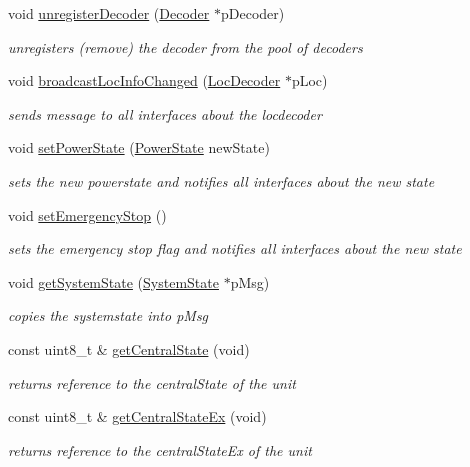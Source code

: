 \begin{DoxyCompactItemize}
void \hyperlink{classTBT_1_1Manager_a507ac74f4adfbb6173728bebe71e40e6_a507ac74f4adfbb6173728bebe71e40e6}{unregister\+Decoder} (\hyperlink{classTBT_1_1Decoder}{Decoder} $\ast$p\+Decoder)
\begin{DoxyCompactList}\small\item\em unregisters (remove) the decoder from the pool of decoders \end{DoxyCompactList}\item 
void \hyperlink{classTBT_1_1Manager_aaac6dc1a57d9c578a3da2243584a8a22_aaac6dc1a57d9c578a3da2243584a8a22}{broadcast\+Loc\+Info\+Changed} (\hyperlink{classTBT_1_1LocDecoder}{Loc\+Decoder} $\ast$p\+Loc)
\begin{DoxyCompactList}\small\item\em sends message to all interfaces about the locdecoder \end{DoxyCompactList}\item 
void \hyperlink{classTBT_1_1Manager_a6e7616a839a1b48d89355bc740ed7793_a6e7616a839a1b48d89355bc740ed7793}{set\+Power\+State} (\hyperlink{namespaceTBT_a05cc33b74a68fb6eaf5962b5979716d4_a05cc33b74a68fb6eaf5962b5979716d4}{Power\+State} new\+State)
\begin{DoxyCompactList}\small\item\em sets the new powerstate and notifies all interfaces about the new state \end{DoxyCompactList}\item 
void \hyperlink{classTBT_1_1Manager_a5f5fdba7ccae731f3f348b572fd0ed16_a5f5fdba7ccae731f3f348b572fd0ed16}{set\+Emergency\+Stop} ()
\begin{DoxyCompactList}\small\item\em sets the emergency stop flag and notifies all interfaces about the new state \end{DoxyCompactList}\item 
void \hyperlink{classTBT_1_1Manager_a007018b4e6441c9af63cb72f1ffc8a19_a007018b4e6441c9af63cb72f1ffc8a19}{get\+System\+State} (\hyperlink{structTBT_1_1SystemState}{System\+State} $\ast$p\+Msg)
\begin{DoxyCompactList}\small\item\em copies the systemstate into p\+Msg \end{DoxyCompactList}\item 
const uint8\+\_\+t \& \hyperlink{classTBT_1_1Manager_a78e5bea49f6662b5f44c1c0aafe4cb75_a78e5bea49f6662b5f44c1c0aafe4cb75}{get\+Central\+State} (void)
\begin{DoxyCompactList}\small\item\em returns reference to the central\+State of the unit \end{DoxyCompactList}\item 
const uint8\+\_\+t \& \hyperlink{classTBT_1_1Manager_ac080a9e6746a43453d26ea43fd046c14_ac080a9e6746a43453d26ea43fd046c14}{get\+Central\+State\+Ex} (void)
\begin{DoxyCompactList}\small\item\em returns reference to the central\+State\+Ex of the unit \end{DoxyCompactList}\end{DoxyCompactItemize}
